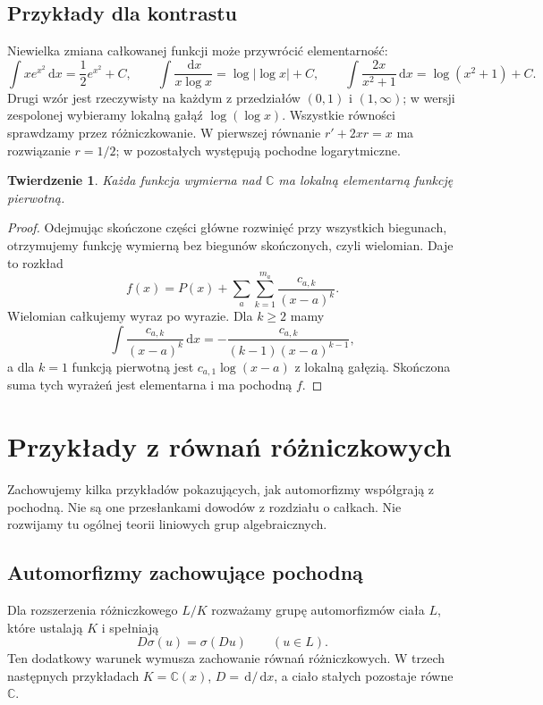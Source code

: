 \documentclass[11pt,a4paper,oneside]{book}
\numberwithin{equation}{section}
\theoremstyle{plain}
\newtheorem{twierdzenie}{Twierdzenie}[chapter]
\theoremstyle{definition}
\theoremstyle{remark}
\newcommand{\C}{\mathbb{C}}
\newcommand{\dd}{\,\mathrm{d}}
\begin{document}
\section{Przykłady dla kontrastu}

Niewielka zmiana całkowanej funkcji może przywrócić elementarność:
\[
\int x e^{x^2}\dd x=\frac12e^{x^2}+C,\qquad
\int\frac{\dd x}{x\log x}=\log|\log x|+C,
\qquad
\int\frac{2x}{x^2+1}\dd x=\log(x^2+1)+C.
\]
Drugi wzór jest rzeczywisty na każdym z przedziałów $(0,1)$ i $(1,\infty)$; w wersji zespolonej wybieramy lokalną gałąź $\log(\log x)$. Wszystkie równości sprawdzamy przez różniczkowanie. W pierwszej równanie $r'+2xr=x$ ma rozwiązanie $r=1/2$; w pozostałych występują pochodne logarytmiczne.

\begin{twierdzenie}
Każda funkcja wymierna nad $\C$ ma lokalną elementarną funkcję pierwotną.
\end{twierdzenie}
\begin{proof}
Odejmując skończone części główne rozwinięć przy wszystkich biegunach, otrzymujemy funkcję wymierną bez biegunów skończonych, czyli wielomian. Daje to rozkład
\[
f(x)=P(x)+\sum_a\sum_{k=1}^{m_a}\frac{c_{a,k}}{(x-a)^k}.
\]
Wielomian całkujemy wyraz po wyrazie. Dla $k\ge2$ mamy
\[
\int\frac{c_{a,k}}{(x-a)^k}\dd x
=-\frac{c_{a,k}}{(k-1)(x-a)^{k-1}},
\]
a dla $k=1$ funkcją pierwotną jest $c_{a,1}\log(x-a)$ z lokalną gałęzią. Skończona suma tych wyrażeń jest elementarna i ma pochodną $f$.
\end{proof}


\chapter{Przykłady z równań różniczkowych}

Zachowujemy kilka przykładów pokazujących, jak automorfizmy współgrają z pochodną. Nie są one przesłankami dowodów z rozdziału o całkach. Nie rozwijamy tu ogólnej teorii liniowych grup algebraicznych.

\section{Automorfizmy zachowujące pochodną}

Dla rozszerzenia różniczkowego $L/K$ rozważamy grupę automorfizmów ciała $L$, które ustalają $K$ i spełniają
\[
D\sigma(u)=\sigma(Du)\qquad(u\in L).
\]
Ten dodatkowy warunek wymusza zachowanie równań różniczkowych. W trzech następnych przykładach $K=\C(x)$, $D=\dd/\dd x$, a ciało stałych pozostaje równe $\C$.
\end{document}
